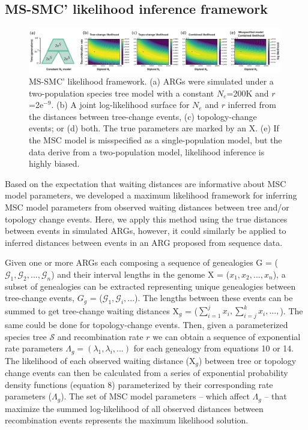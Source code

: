 \documentclass[11pt]{article}
\begin{document}
\subsection{MS-SMC' likelihood inference framework}

\begin{figure}[t]
	\centering
	\includegraphics[width=0.99\textwidth]{figures/likelihood-figure3.pdf}
	\caption{
		MS-SMC' likelihood framework. (a) ARGs were simulated under a
		two-population species tree model with a constant $N_e$=200K and 
		$r$=2e$^{-9}$. (b) A joint log-likelihood surface for $N_e$ and 
		$r$ inferred from the distances between tree-change events, 
		(c) topology-change events; or (d) both. The true parameters are
		marked by an X. (e) If the MSC model is
		misspecified as a single-population model, but the data derive from 
		a two-population model, likelihood inference	is highly biased.
	}
	\label{fig:fig-likelihood}
\end{figure}

Based on the expectation that waiting distances are informative about 
MSC model parameters, we developed a maximum likelihood framework for inferring 
MSC model parameters from observed waiting distances between tree and/or topology 
change events. Here, we apply this method using the true distances between 
events in simulated ARGs, however, it could similarly be applied to inferred 
distances between events in an ARG proposed from sequence data. 

Given one or more ARGs each composing a sequence of genealogies 
G = ($\mathcal{G}_1, \mathcal{G}_2, ..., \mathcal{G}_n$) and 
their interval lengths in the genome X = ($x_1, x_2, ..., x_n$), a subset 
of genealogies can be extracted representing unique genealogies between 
tree-change events, $G_g$ = ($\mathcal{G}_1, \mathcal{G}_i, ...$). The lengths 
between these events can be summed to get tree-change waiting distances
X$_g$ = ($\sum_{i=1}^j x_i, \sum_{i=j}^{k} x_i, ..., $). The same could be 
done for topology-change events. Then, given a parameterized species 
tree $\mathcal{S}$ and recombination rate $r$ we can obtain a sequence of 
exponential rate parameters $\Lambda_g = (\lambda_1, \lambda_i, ...)$ for
each genealogy from equations 10 or 14. 
The likelihood of each observed waiting distance (X$_g$) between tree or
topology change events can then be calculated from a series of exponential 
probability density functions (equation 8) parameterized by their 
corresponding rate parameters ($\Lambda_g$). 
The set of MSC model parameters -- which affect $\Lambda_g$ -- 
that maximize the summed log-likelihood of all observed distances 
between recombination events represents the maximum likelihood solution.
\end{document}
